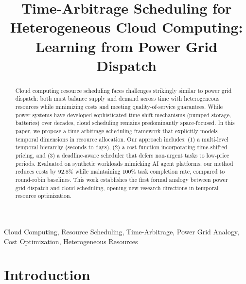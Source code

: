 \documentclass[10pt,conference]{IEEEtran}
\begin{document}
\title{Time-Arbitrage Scheduling for Heterogeneous Cloud Computing: Learning from Power Grid Dispatch}

\author{
    \and
}

\maketitle

\begin{abstract}
Cloud computing resource scheduling faces challenges strikingly similar to power grid dispatch: both must balance supply and demand across time with heterogeneous resources while minimizing costs and meeting quality-of-service guarantees. While power systems have developed sophisticated time-shift mechanisms (pumped storage, batteries) over decades, cloud scheduling remains predominantly space-focused. In this paper, we propose a time-arbitrage scheduling framework that explicitly models temporal dimensions in resource allocation. Our approach includes: (1) a multi-level temporal hierarchy (seconds to days), (2) a cost function incorporating time-shifted pricing, and (3) a deadline-aware scheduler that defers non-urgent tasks to low-price periods. Evaluated on synthetic workloads mimicking AI agent platforms, our method reduces costs by 92.8\% while maintaining 100\% task completion rate, compared to round-robin baselines. This work establishes the first formal analogy between power grid dispatch and cloud scheduling, opening new research directions in temporal resource optimization.
\end{abstract}

\begin{IEEEkeywords}
Cloud Computing, Resource Scheduling, Time-Arbitrage, Power Grid Analogy, Cost Optimization, Heterogeneous Resources
\end{IEEEkeywords}

\section{Introduction}
\label{sec:introduction}
\end{document}
